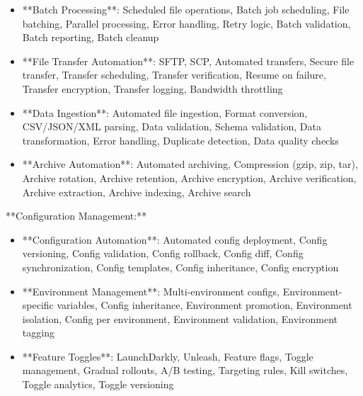 \documentclass[11pt,a4paper]{article}
\begin{document}
\begin{itemize}
\item **Batch Processing**: Scheduled file operations, Batch job scheduling, File batching, Parallel processing, Error handling, Retry logic, Batch validation, Batch reporting, Batch cleanup
\end{itemize}

\begin{itemize}
\item **File Transfer Automation**: SFTP, SCP, Automated transfers, Secure file transfer, Transfer scheduling, Transfer verification, Resume on failure, Transfer encryption, Transfer logging, Bandwidth throttling
\end{itemize}

\begin{itemize}
\item **Data Ingestion**: Automated file ingestion, Format conversion, CSV/JSON/XML parsing, Data validation, Schema validation, Data transformation, Error handling, Duplicate detection, Data quality checks
\end{itemize}

\begin{itemize}
\item **Archive Automation**: Automated archiving, Compression (gzip, zip, tar), Archive rotation, Archive retention, Archive encryption, Archive verification, Archive extraction, Archive indexing, Archive search
\end{itemize}

**Configuration Management:**

\begin{itemize}
\item **Configuration Automation**: Automated config deployment, Config versioning, Config validation, Config rollback, Config diff, Config synchronization, Config templates, Config inheritance, Config encryption
\end{itemize}

\begin{itemize}
\item **Environment Management**: Multi-environment configs, Environment-specific variables, Config inheritance, Environment promotion, Environment isolation, Config per environment, Environment validation, Environment tagging
\end{itemize}

\begin{itemize}
\item **Feature Toggles**: LaunchDarkly, Unleash, Feature flags, Toggle management, Gradual rollouts, A/B testing, Targeting rules, Kill switches, Toggle analytics, Toggle versioning
\end{itemize}
\end{document}
